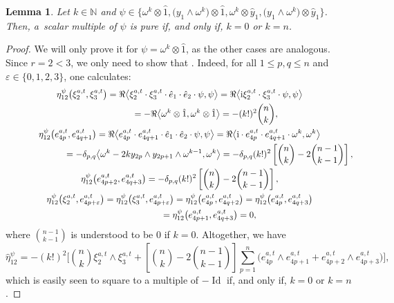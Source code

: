\documentclass[pdftex]{sigma}
\numberwithin{equation}{section}
\newtheorem{Lemma}[Theorem]{Lemma}
\DeclareMathOperator{\Id}{Id}
\begin{document}
		\begin{Lemma}\label{lemma:cpn_pure_2}
			Let $k \in \mathbb{N}$ and $\psi \in \bigl\{ \omega^k \otimes \hat{1}, \bigl(y_1 \wedge \omega^k\bigr) \otimes \hat{1} , \omega^k \otimes \hat{y}_1 , \bigl(y_1 \wedge \omega^k\bigr) \otimes \hat{y}_1 \bigr\}$. Then, a~scalar multiple of $\psi$ is pure if, and only if, $k=0$ or $k=n$.
		\end{Lemma}
		\begin{proof}
			We will only prove it for $\psi = \omega^k \otimes \hat{1}$, as the other cases are analogous. Since $r=2<3$, we only need to show that \smash{$\bigl( \hat{\eta}_{12}^{\psi} \bigr)^2 = - \Id$}. Indeed, for all $1 \leq p , q \leq n$ and $\varepsilon \in \{0,1,2,3\}$, one calculates:
			\begin{gather*}
				\eta^{\psi}_{12} \bigl(\xi^{a,t}_{2}, \xi^{a,t}_{3}\bigr) = \Re \big\langle \xi^{a,t}_{2} \cdot \xi^{a,t}_{3} \cdot \hat{e}_1 \cdot \hat{e}_2 \cdot \psi , \psi \big\rangle = \Re \big\langle {\rm i} \xi^{a,t}_{2} \cdot \xi^{a,t}_{3} \cdot \psi , \psi\big\rangle \\
				 \phantom{\eta^{\psi}_{12} \bigl(\xi^{a,t}_{2}, \xi^{a,t}_{3}\bigr) }{} = - \Re \big\langle \omega^k \otimes \hat{1} , \omega^k \otimes \hat{1}\big\rangle = -(k!)^2 \binom{n}{k} , \\
				\eta^{\psi}_{12} \bigl(e^{a,t}_{4p}, e^{a,t}_{4q+1}\bigr) = \Re \big\langle e^{a,t}_{4p} \cdot e^{a,t}_{4q+1} \cdot \hat{e}_1 \cdot \hat{e}_2 \cdot \psi , \psi \big\rangle = \Re \big\langle {\rm i} \cdot e^{a,t}_{4p} \cdot e^{a,t}_{4q+1} \cdot \omega^k , \omega^k \big\rangle \\
				 \phantom{\eta^{\psi}_{12} \bigl(e^{a,t}_{4p}, e^{a,t}_{4q+1}\bigr) }{} = - \delta_{p,q} \big\langle\omega^k - 2 k y_{2p} \wedge y_{2p+1} \wedge \omega^{k-1}, \omega^k \big\rangle = -\delta_{p,q}(k!)^2 \left[ \binom{n}{k} - 2 \binom{n-1}{k-1} \right] , \\
				\eta^{\psi}_{12} \bigl(e^{a,t}_{4p+2}, e^{a,t}_{4q+3}\bigr) = -\delta_{p,q}(k!)^2 \left[ \binom{n}{k} - 2 \binom{n-1}{k-1} \right] , \\
				\eta^{\psi}_{12} \bigl(\xi^{a,t}_{2}, e^{a,t}_{4p + \varepsilon}\bigr) = \eta^{\psi}_{12} \bigl(\xi^{a,t}_{3}, e^{a,t}_{4p + \varepsilon}\bigr) = \eta^{\psi}_{12} \bigl(e^{a,t}_{4p}, e^{a,t}_{4q+2}\bigr) = \eta^{\psi}_{12} \bigl(e^{a,t}_{4p}, e^{a,t}_{4q+3}\bigr)\\
\phantom{\eta^{\psi}_{12} \bigl(\xi^{a,t}_{2}, e^{a,t}_{4p + \varepsilon}\bigr)}{} = \eta^{\psi}_{12} \bigl(e^{a,t}_{4p+1}, e^{a,t}_{4q+3}\bigr) = 0 ,
			\end{gather*}
			where $\binom{n-1}{k-1}$ is understood to be $0$ if $k = 0$. Altogether, we have
			\[
			\hat{\eta}^{\psi}_{12} = -(k!)^2 \Bigg[ \binom{n}{k} \xi^{a,t}_2 \wedge \xi^{a,t}_3 + \left[ \binom{n}{k} - 2 \binom{n-1}{k-1} \right] \sum_{p=1}^{n} \bigl( e^{a,t}_{4p} \wedge e^{a,t}_{4p+1} + e^{a,t}_{4p+2} \wedge e^{a,t}_{4p+3}\bigr) \Bigg] ,
			\]
			which is easily seen to square to a multiple of $- \Id$ if, and only if, $k=0$ or $k=n$.
		\end{proof}
		
\end{document}
